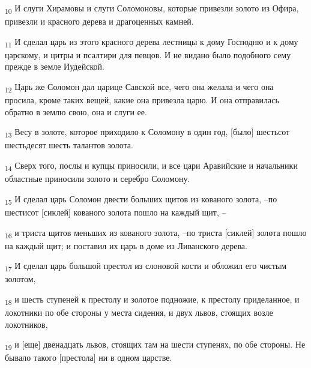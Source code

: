 \begin{tcolorbox}
\textsubscript{10} И слуги Хирамовы и слуги Соломоновы, которые привезли золото из Офира, привезли и красного дерева и драгоценных камней.
\end{tcolorbox}
\begin{tcolorbox}
\textsubscript{11} И сделал царь из этого красного дерева лестницы к дому Господню и к дому царскому, и цитры и псалтири для певцов. И не видано было подобного сему прежде в земле Иудейской.
\end{tcolorbox}
\begin{tcolorbox}
\textsubscript{12} Царь же Соломон дал царице Савской все, чего она желала и чего она просила, кроме таких вещей, какие она привезла царю. И она отправилась обратно в землю свою, она и слуги ее.
\end{tcolorbox}
\begin{tcolorbox}
\textsubscript{13} Весу в золоте, которое приходило к Соломону в один год, [было] шестьсот шестьдесят шесть талантов золота.
\end{tcolorbox}
\begin{tcolorbox}
\textsubscript{14} Сверх того, послы и купцы приносили, и все цари Аравийские и начальники областные приносили золото и серебро Соломону.
\end{tcolorbox}
\begin{tcolorbox}
\textsubscript{15} И сделал царь Соломон двести больших щитов из кованого золота, --по шестисот [сиклей] кованого золота пошло на каждый щит, --
\end{tcolorbox}
\begin{tcolorbox}
\textsubscript{16} и триста щитов меньших из кованого золота, --по триста [сиклей] золота пошло на каждый щит; и поставил их царь в доме из Ливанского дерева.
\end{tcolorbox}
\begin{tcolorbox}
\textsubscript{17} И сделал царь большой престол из слоновой кости и обложил его чистым золотом,
\end{tcolorbox}
\begin{tcolorbox}
\textsubscript{18} и шесть ступеней к престолу и золотое подножие, к престолу приделанное, и локотники по обе стороны у места сидения, и двух львов, стоящих возле локотников,
\end{tcolorbox}
\begin{tcolorbox}
\textsubscript{19} и [еще] двенадцать львов, стоящих там на шести ступенях, по обе стороны. Не бывало такого [престола] ни в одном царстве.
\end{tcolorbox}

